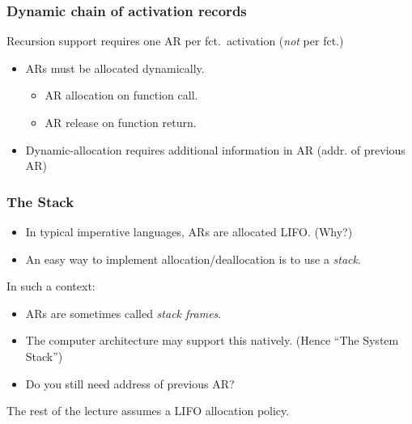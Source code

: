 \documentclass{beamer}
\begin{document}
\begin{frame}[fragile]
\frametitle{Dynamic chain of activation records}

Recursion support requires one AR per fct.\ activation (\emph{not} per fct.)

\begin{itemize}
\item ARs must be allocated dynamically.
\begin{itemize}
\item AR allocation on function call.
\item AR release on function return.
\end{itemize}
\item Dynamic-allocation requires additional information in AR
  (addr. of previous AR)
\end{itemize}

\begin{center}
\end{center}

\end{frame}

\begin{frame}
\frametitle{The Stack}


\begin{itemize}
\item In typical imperative languages, ARs are allocated LIFO. (Why?)
\item An easy way to implement allocation/deallocation is to use a \emph{stack}.
\end{itemize}

In such a context:
\begin{itemize}

\item ARs are sometimes called \textit{stack frames}. 

\item The computer architecture may support this natively. (Hence ``The System Stack'')

\item Do you still need address of previous AR?

\end{itemize}

The rest of the lecture assumes a LIFO allocation policy.

\end{frame}
\end{document}

